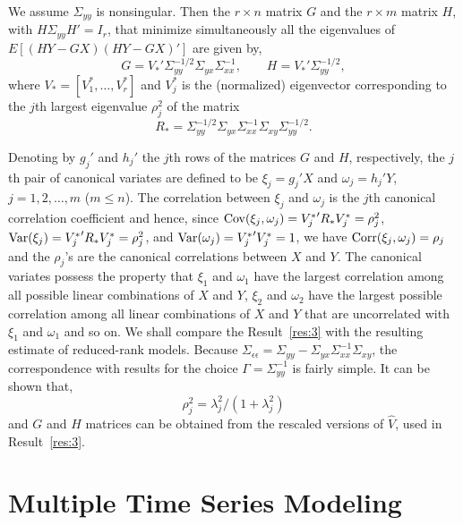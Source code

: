 \begin{result} \label{res:4} 
We assume $\Sigma_{yy}$ is nonsingular. Then the $r \times n$ matrix $G$ and the $r \times m$ matrix $H$, with $H \Sigma_{yy}H'= I_r$, that minimize simultaneously all the eigenvalues of $E[(HY-GX)(HY-GX)']$ are given by,
	\begin{equation}
	G= V_*'  \Sigma_{yy}^{-1/2} \Sigma_{yx} \Sigma_{xx}^{-1}, \qquad H= V_*'  \Sigma_{yy}^{-1/2},
	\end{equation}
where $V_*= [V_1^*, \ldots, V_r^*]$ and $V_j^*$ is the (normalized) eigenvector corresponding to the $j$th largest eigenvalue $\rho_j^2$ of the matrix
	\begin{equation} \label{eqn:eigenlargestmatrix}
	R_*= \Sigma_{yy}^{-1/2} \Sigma_{yx} \Sigma_{xx}^{-1} \Sigma_{xy} \Sigma_{yy}^{-1/2}.
	\end{equation}
\end{result}


Denoting by $g_j'$ and $h_j'$ the $j$th rows of the matrices $G$ and $H$, respectively, the $j$th pair of canonical variates are defined to be $\xi_j= g_j' X$ and $\omega_j= h_j' Y$, $j= 1, 2, \ldots, m$ ($m \leq n$). The correlation between $\xi_j$ and $\omega_j$ is the $j$th canonical correlation coefficient and hence, since $\operatorname{Cov}(\xi_j, \omega_j)= {V_j^*}' R_* V_j^*= \rho_j^2$, $\operatorname{Var}(\xi_j)= {V_j^*}' R_* V_j^*= \rho_j^2$, and $\operatorname{Var}(\omega_j) ={V_j^*}' V_j^*= 1$, we have $\operatorname{Corr}(\xi_j, \omega_j)= \rho_j$ and the $\rho_j$'s are the canonical correlations between $X$ and $Y$. The canonical variates possess the property that $\xi_1$ and $\omega_1$ have the largest correlation among all possible linear combinations of $X$ and $Y$, $\xi_2$ and $\omega_2$ have the largest possible correlation among all linear combinations of $X$ and $Y$ that are uncorrelated with $\xi_1$ and $\omega_1$ and so on. We shall compare the Result~\ref{res:3} with the resulting estimate of reduced-rank models. Because $\Sigma_{\epsilon\epsilon}= \Sigma_{yy} - \Sigma_{yx} \Sigma_{xx}^{-1} \Sigma_{xy}$, the correspondence with results for the choice $\Gamma= \Sigma_{yy}^{-1}$ is fairly simple. It can be shown that,
	\begin{equation} \label{eqn:rhojsqlambj}
	\rho_j^2= \lambda_j^2 / (1+\lambda_j^2)
	\end{equation}
and $G$ and $H$ matrices can be obtained from the rescaled versions of $\hat{V}$, used in Result~\ref{res:3}.



\section{Multiple Time Series Modeling}


